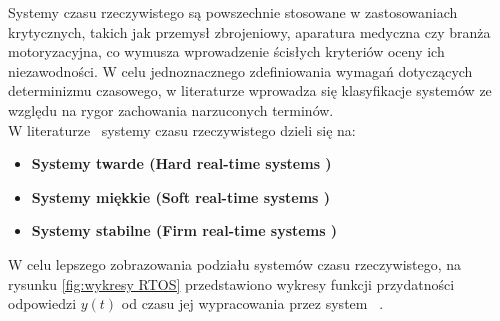 Systemy czasu rzeczywistego są powszechnie stosowane w zastosowaniach krytycznych, takich jak przemysł zbrojeniowy, aparatura medyczna czy branża motoryzacyjna, co wymusza wprowadzenie ścisłych kryteriów oceny ich niezawodności. W celu jednoznacznego zdefiniowania wymagań dotyczących determinizmu czasowego,
 w literaturze wprowadza się klasyfikacje systemów ze względu na rygor zachowania narzuconych terminów.
\\W literaturze~\cite{Tanenbaum} systemy czasu rzeczywistego dzieli się na:
\begin{itemize}
    \item \textbf{Systemy twarde (Hard real-time systems )} 
    \item \textbf{Systemy miękkie (Soft real-time systems )}
    \item \textbf{Systemy stabilne (Firm real-time systems )} 
\end{itemize}
W celu lepszego zobrazowania podziału systemów czasu rzeczywistego, na rysunku \cref{fig:wykresy RTOS} przedstawiono wykresy funkcji przydatności odpowiedzi $y(t)$ od czasu jej wypracowania przez system ~\cite{Tanenbaum}. 

